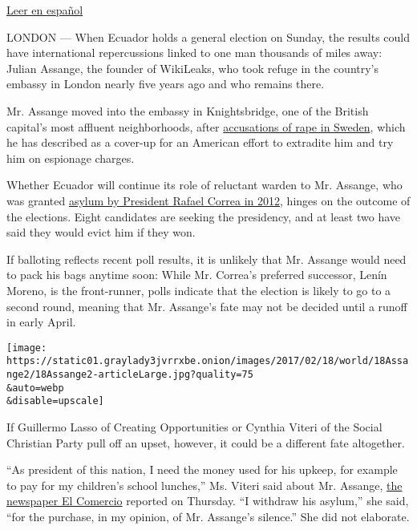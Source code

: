 \href{https://www.nytimes3xbfgragh.onion/es/2017/02/17/con-las-elecciones-en-ecuador-queda-incierto-el-futuro-de-julian-assange/}{Leer
en español}

LONDON --- When Ecuador holds a general election on Sunday, the results
could have international repercussions linked to one man thousands of
miles away: Julian Assange, the founder of WikiLeaks, who took refuge in
the country's embassy in London nearly five years ago and who remains
there.

Mr. Assange moved into the embassy in Knightsbridge, one of the British
capital's most affluent neighborhoods, after
\href{https://www.nytimes3xbfgragh.onion/2016/12/07/world/europe/assange-gives-detailed-account-of-rape-accusation.html}{accusations
of rape in Sweden}, which he has described as a cover-up for an American
effort to extradite him and try him on espionage charges.

Whether Ecuador will continue its role of reluctant warden to Mr.
Assange, who was granted
\href{http://www.nytimes3xbfgragh.onion/2012/08/17/world/americas/ecuador-to-let-assange-stay-in-its-embassy.html}{asylum
by President Rafael Correa in 2012}, hinges on the outcome of the
elections. Eight candidates are seeking the presidency, and at least two
have said they would evict him if they won.

If balloting reflects recent poll results, it is unlikely that Mr.
Assange would need to pack his bags anytime soon: While Mr. Correa's
preferred successor, Lenín Moreno, is the front-runner, polls indicate
that the election is likely to go to a second round, meaning that Mr.
Assange's fate may not be decided until a runoff in early April.

\texttt{[image: https://static01.graylady3jvrrxbe.onion/images/2017/02/18/world/18Assange2/18Assange2-articleLarge.jpg?quality=75\\\&auto=webp\\\&disable=upscale]}

If Guillermo Lasso of Creating Opportunities or Cynthia Viteri of the
Social Christian Party pull off an upset, however, it could be a
different fate altogether.

``As president of this nation, I need the money used for his upkeep, for
example to pay for my children's school lunches,'' Ms. Viteri said about
Mr. Assange,
\href{http://elcomercio.pe/mundo/latinoamerica/ecuador-viteri-retirara-asilo-assange-si-gana-elecciones-noticia-1969235}{the
newspaper El Comercio} reported on Thursday. ``I withdraw his asylum,''
she said, ``for the purchase, in my opinion, of Mr. Assange's silence.''
She did not elaborate.

